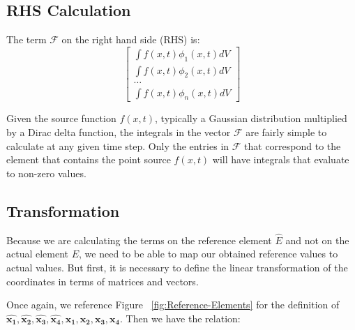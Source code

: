 \subsection{RHS Calculation}

The term $\mathcal{F}$ on the right hand side (RHS) is:
\begin{equation}
\begin{bmatrix}
\int f(x,t) \phi_1(x,t) dV \\
\int f(x,t) \phi_2(x,t) dV \\
\ldots \\
\int f(x,t) \phi_n(x,t) dV
\end{bmatrix}
\end{equation}

Given the source function $f(x,t)$, typically a Gaussian distribution multiplied by a Dirac delta function, the integrals in the vector $\mathcal{F}$ are fairly simple to calculate at any given time step. Only the entries in $\mathcal{F}$ that correspond to the element that contains the point source $f(x,t)$ will have integrals that evaluate to non-zero values.

\subsection{Transformation}
\label{subsec: Transformation}

Because we are calculating the terms on the reference element $\hat{E}$ and not on the actual element $E$, we need to be able to map our obtained reference values to actual values. But first, it is necessary to define the linear transformation of the coordinates in terms of matrices and vectors. 

Once again, we reference Figure ~\ref{fig:Reference-Elements} for the definition of $\boldsymbol{\hat{x_1}}, \boldsymbol{\hat{x_2}}, \boldsymbol{\hat{x_3}}, \boldsymbol{\hat{x_4}}, \boldsymbol{x_1}, \boldsymbol{x_2}, \boldsymbol{x_3}, \boldsymbol{x_4}$. Then we have the relation:

